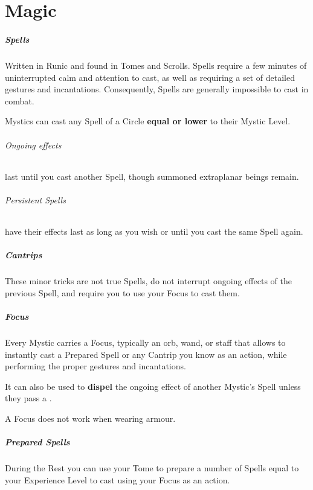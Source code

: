 \documentclass[itdr]{subfiles}
\begin{document}
\chapter{Magic}
\label{ch:magic}

\paragraph{Spells}
Written in Runic and found in Tomes and Scrolls. Spells require a few minutes of uninterrupted calm and attention to cast, as well as requiring a set of detailed gestures and incantations. Consequently, Spells are generally impossible to cast in combat.

Mystics can cast any Spell of a Circle \textbf{equal or lower} to their Mystic Level.

\subparagraph{Ongoing effects} last until you cast another Spell, though summoned extraplanar beings remain.

\subparagraph{Persistent Spells} have their effects last as long as you wish or until you cast the same Spell again.

\vfill
{}
\paragraph{Cantrips}
These minor tricks are not true Spells, do not interrupt ongoing effects of the previous Spell, and require you to use your Focus to cast them.

\vfill
{}
\paragraph{Focus}
Every Mystic carries a Focus, typically an orb, wand, or staff that allows to instantly cast a Prepared Spell or any Cantrip you know as an action, while performing the proper gestures and incantations.

It can also be used to \textbf{dispel} the ongoing effect of another Mystic's Spell unless they pass a .

A Focus does not work when wearing armour.

\vfill
{}
\paragraph{Prepared Spells}
During the Rest you can use your Tome to prepare a number of Spells equal to your Experience Level to cast using your Focus as an action.
\end{document}
